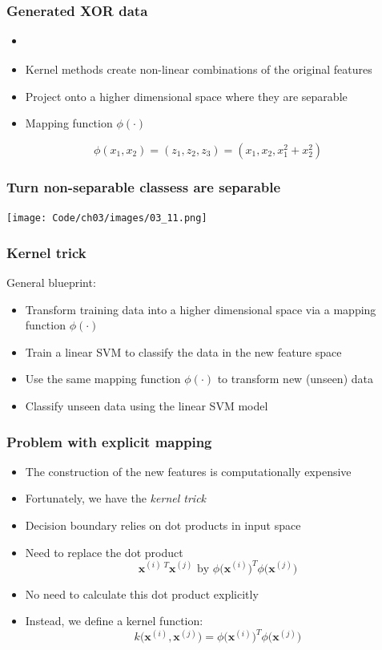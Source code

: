\documentclass{beamer}
\begin{document}
\begin{frame}
  \frametitle{Generated XOR data}
  \begin{itemize}
  \item \href{https://github.com/rasbt/python-machine-learning-book/blob/master/code/ch03/ch03.ipynb}{}
  \item Kernel methods create non-linear combinations of the original features
  \item Project onto a higher dimensional space where they are separable
  \item Mapping function $\phi(\cdot)$
  \end{itemize}
  \[
  \phi(x_1, x_2) = (z_1, z_2, z_3) = (x_1, x_2, x_{1}^{2} + x_{2}^{2})
  \]
\end{frame}

\begin{frame}
  \frametitle{Turn non-separable classess are separable}
  \texttt{[image: Code/ch03/images/03\_11.png]}
\end{frame}

\begin{frame}
  \frametitle{Kernel trick}
  General blueprint:
  \begin{itemize}
  \item Transform training data into a higher dimensional space via a mapping function $\phi(\cdot)$
  \item Train a linear SVM to classify the data in the new feature space
  \item Use the same mapping function $\phi(\cdot)$ to transform new (unseen) data
  \item Classify unseen data using the linear SVM model
  \end{itemize}
\end{frame}

\begin{frame}
  \frametitle{Problem with explicit mapping}
  \begin{itemize}
  \item The construction of the new features is computationally expensive
  \item Fortunately, we have the \textit{kernel trick}
  \item Decision boundary relies on dot products in input space
  \item Need to replace the dot product
    \[
    \mathbf{x}^{(i) \; T} \mathbf{x}^{(j)} \text{ by } \phi \big( \mathbf{x}^{(i)} \big)^T \phi \big( \mathbf{x}^{(j)} \big)
    \]
  \item No need to calculate this dot product explicitly
  \item Instead, we define a kernel function:
    \[
    k \big( \mathbf{x}^{(i)}, \mathbf{x}^{(j)}  \big) = \phi \big( \mathbf{x}^{(i)} \big)^T \phi \big( \mathbf{x}^{(j)} \big)
    \]
  \end{itemize}
\end{frame}
\end{document}
